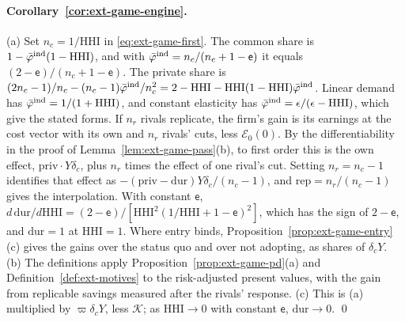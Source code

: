 \paragraph{Corollary~\ref{cor:ext-game-engine}.} (a) Set $n_c=1/\mathrm{HHI}$ in \eqref{eq:ext-game-first}. The common share is $1-\bar\varphi^{\rm ind}(1-\mathrm{HHI})$, and with $\bar\varphi^{\rm ind}=n_c/(n_c+1-\mathsf e)$ it equals $(2-\mathsf e)/(n_c+1-\mathsf e)$. The private share is $(2n_c-1)/n_c-(n_c-1)\bar\varphi^{\rm ind}/n_c^2=2-\mathrm{HHI}-\mathrm{HHI}(1-\mathrm{HHI})\bar\varphi^{\rm ind}$. Linear demand has $\bar\varphi^{\rm ind}=1/(1+\mathrm{HHI})$, and constant elasticity has $\bar\varphi^{\rm ind}=\epsilon/(\epsilon-\mathrm{HHI})$, which give the stated forms. If $n_r$ rivals replicate, the firm's gain is its earnings at the cost vector with its own and $n_r$ rivals' cuts, less $\mathcal E_0(0)$. By the differentiability in the proof of Lemma~\ref{lem:ext-game-pass}(b), to first order this is the own effect, $\mathrm{priv}\cdot Y\delta_c$, plus $n_r$ times the effect of one rival's cut. Setting $n_r=n_c-1$ identifies that effect as $-(\mathrm{priv}-\mathrm{dur})Y\delta_c/(n_c-1)$, and $\mathrm{rep}=n_r/(n_c-1)$ gives the interpolation. With constant $\mathsf e$, $d\,\mathrm{dur}/d\mathrm{HHI}=(2-\mathsf e)/[\mathrm{HHI}^2(1/\mathrm{HHI}+1-\mathsf e)^2]$, which has the sign of $2-\mathsf e$, and $\mathrm{dur}=1$ at $\mathrm{HHI}=1$. Where entry binds, Proposition~\ref{prop:ext-game-entry}(c) gives the gains over the status quo and over not adopting, as shares of $\delta_cY$. (b) The definitions apply Proposition~\ref{prop:ext-game-pd}(a) and Definition~\ref{def:ext-motives} to the risk-adjusted present values, with the gain from replicable savings measured after the rivals' response. (c) This is (a) multiplied by $\varpi\delta_cY$, less $\mathcal K$; as $\mathrm{HHI}\to0$ with constant $\mathsf e$, $\mathrm{dur}\to0$. \qed
